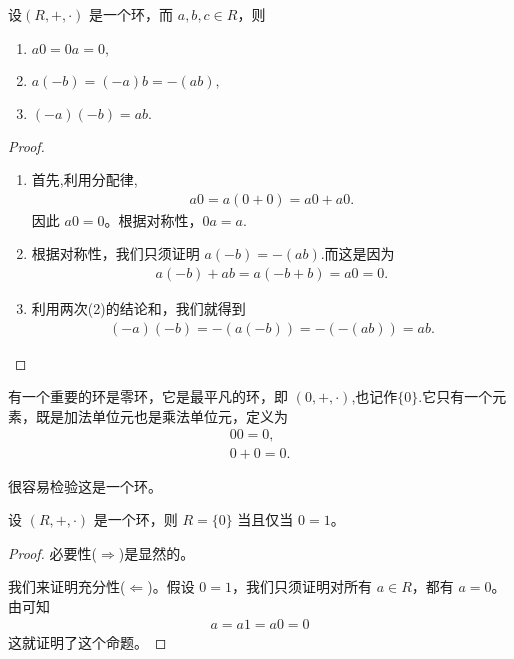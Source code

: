 \documentclass[../../main.tex]{subfiles}
\begin{document}
\begin{proposition}\label{proposition:环的加法单位元和乘法逆元的性质}
设$(R, +, \cdot)$ 是一个环，而 $a,b,c\in R$，则
\begin{enumerate}[(1)]
\item $a0 = 0a = 0,$

\item $a(-b)=(-a)b=-(ab),$

\item $(-a)(-b)=ab.$
\end{enumerate}
\end{proposition}
\begin{proof}
\begin{enumerate}[(1)]
\item 首先,利用分配律,
\begin{align*}
a0 = a(0 + 0)=a0 + a0.
\end{align*}
因此 $a0 = 0$。根据对称性，$0a = a$.

\item 根据对称性，我们只须证明 $a(-b)=-(ab)$.而这是因为
\begin{align*}
a(-b)+ab = a(-b + b)=a0 = 0.
\end{align*}

\item 利用两次(2)的结论和，我们就得到
\begin{align*}
(-a)(-b)=-(a(-b))=-(-(ab)) = ab.
\end{align*} 
\end{enumerate}
\end{proof}

\begin{definition}[零环]
有一个重要的环是零环，它是最平凡的环，即 $(0, +, \cdot)$,也记作$\{0\}$.它只有一个元素，既是加法单位元也是乘法单位元，定义为
\begin{gather*}
00 = 0 ,\\
0 + 0 = 0 .
\end{gather*} 
\end{definition}
\begin{note}
很容易检验这是一个环。
\end{note}

\begin{proposition}[零环的充要条件]\label{proposition:零环的充要条件}
设 $(R, +, \cdot)$ 是一个环，则 $R = \{0\}$ 当且仅当 $0 = 1$。
\end{proposition}
\begin{proof}
必要性($\Rightarrow$)是显然的。

我们来证明充分性($\Leftarrow$)。假设 $0 = 1$，我们只须证明对所有 $a \in R$，都有 $a = 0$。由可知
\begin{align*}
a = a1 = a0 = 0
\end{align*}
这就证明了这个命题。 
\end{proof}
\end{document}
